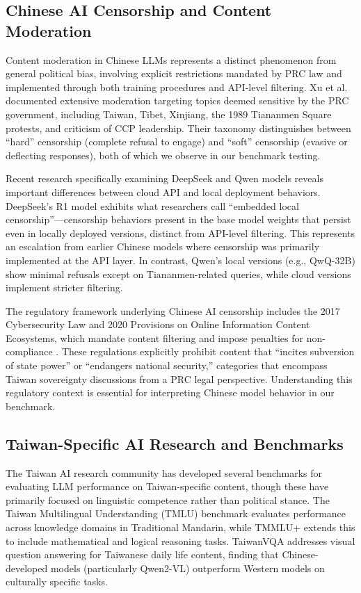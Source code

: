 \documentclass[11pt,a4paper]{article}
\begin{document}
\subsection{Chinese AI Censorship and Content Moderation}

Content moderation in Chinese LLMs represents a distinct phenomenon from general political bias, involving explicit restrictions mandated by PRC law and implemented through both training procedures and API-level filtering. Xu et al. \citep{xu2024censorship} documented extensive moderation targeting topics deemed sensitive by the PRC government, including Taiwan, Tibet, Xinjiang, the 1989 Tiananmen Square protests, and criticism of CCP leadership. Their taxonomy distinguishes between ``hard'' censorship (complete refusal to engage) and ``soft'' censorship (evasive or deflecting responses), both of which we observe in our benchmark testing.

Recent research specifically examining DeepSeek and Qwen models \citep{deepseek2025censorship} reveals important differences between cloud API and local deployment behaviors. DeepSeek's R1 model exhibits what researchers call ``embedded local censorship''---censorship behaviors present in the base model weights that persist even in locally deployed versions, distinct from API-level filtering. This represents an escalation from earlier Chinese models where censorship was primarily implemented at the API layer. In contrast, Qwen's local versions (e.g., QwQ-32B) show minimal refusals except on Tiananmen-related queries, while cloud versions implement stricter filtering.

The regulatory framework underlying Chinese AI censorship includes the 2017 Cybersecurity Law and 2020 Provisions on Online Information Content Ecosystems, which mandate content filtering and impose penalties for non-compliance \citep{china2020provisions}. These regulations explicitly prohibit content that ``incites subversion of state power'' or ``endangers national security,'' categories that encompass Taiwan sovereignty discussions from a PRC legal perspective. Understanding this regulatory context is essential for interpreting Chinese model behavior in our benchmark.

\subsection{Taiwan-Specific AI Research and Benchmarks}

The Taiwan AI research community has developed several benchmarks for evaluating LLM performance on Taiwan-specific content, though these have primarily focused on linguistic competence rather than political stance. The Taiwan Multilingual Understanding (TMLU) benchmark \citep{tmlu2024} evaluates performance across knowledge domains in Traditional Mandarin, while TMMLU+ extends this to include mathematical and logical reasoning tasks. TaiwanVQA \citep{taiwanvqa2024} addresses visual question answering for Taiwanese daily life content, finding that Chinese-developed models (particularly Qwen2-VL) outperform Western models on culturally specific tasks.
\end{document}
